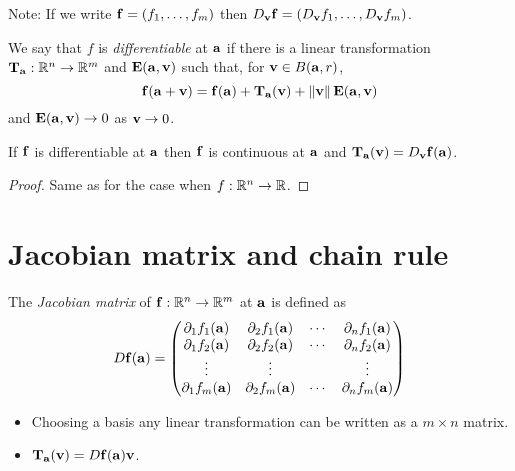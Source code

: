 Note: If we write \(\ff = (f_1,\ldots,f_m)\) then \(D_{\vv}\ff = (D_{\vv}f_1,\ldots,D_{\vv} f_m)\).


\begin{definition}[Differentiable]
    We say that \(f\) is \emph{differentiable} at \(\aa\) if there is a linear transformation \(\mathbf{T}_\aa : \bR^n \to \bR^m\) and \(\mathbf{E}(\aa,\vv)\) such that, for \(\vv\in B(\aa,r)\),
    \[
        \ff(\aa+\vv) = \ff(\aa) + \mathbf{T}_\aa  (\vv )+ \norm{\vv}\mathbf{E}(\aa,\vv)
    \]
    and \(\mathbf{E}(\aa,\vv) \to 0\) as \(\vv \to 0\).
\end{definition}


\begin{theorem}
    If \(\ff\) is differentiable at \(\aa\)
    then \(\ff\) is continuous at \(\aa\)
    and \( \mathbf{T}_{\aa}( \vv) =D_{\vv}\ff(\aa) \).
\end{theorem}

\begin{proof}
    Same as for the case when \(f:\bR^n \to \bR\).
\end{proof}


\section{Jacobian matrix and chain rule}


\begin{definition}
    The \emph{Jacobian matrix} of \(\ff : \bR^n \to \bR^m\) at \(\aa\) is defined as
    \[
        D\ff(\aa) =
        \begin{pmatrix}
            \partial_1 f_1 (\aa) & \partial_2 f_1 (\aa) & \cdots & \partial_n f_1 (\aa) \\
            \partial_1 f_2 (\aa) & \partial_2 f_2 (\aa) & \cdots & \partial_n f_2 (\aa) \\
            \vdots               & \vdots               &        & \vdots               \\
            \partial_1 f_m (\aa) & \partial_2 f_m (\aa) & \cdots & \partial_n f_m (\aa)
        \end{pmatrix}
    \]

\end{definition}




\begin{itemize}
    \item Choosing a basis any linear transformation can be written as a \(m \times n\) matrix.
    \item \( \mathbf{T}_\aa  (\vv ) = D\ff(\aa) \vv\).
\end{itemize}



